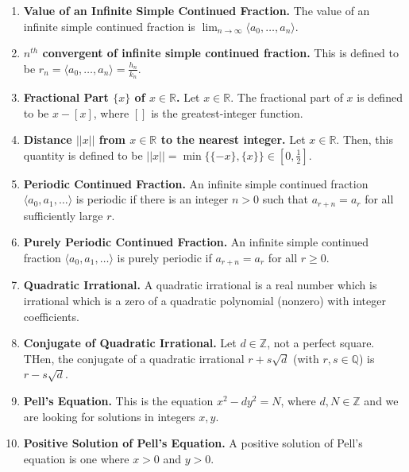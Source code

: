 \documentclass[12pt]{article}
\theoremstyle{definition}
\theoremstyle{named}
\begin{document}
\begin{enumerate}
    \item \textbf{Value of an Infinite Simple Continued Fraction. } The value of an infinite simple continued fraction is $\lim_{n \to \infty} \langle a_0,\dots,a_n \rangle$. 
    \item \textbf{$n^{th}$ convergent of infinite simple continued fraction. } This is defined to be $r_n = \langle a_0,\dots,a_n \rangle = \frac{h_n}{k_n}$. 
    \item \textbf{Fractional Part $\{x\}$ of $x \in \mathbb{R}$. } Let $x \in \mathbb{R}$. The fractional part of $x$ is defined to be $x - [x]$, where $[]$ is the greatest-integer function. 
    \item \textbf{Distance $||x||$ from $x \in \mathbb{R}$ to the nearest integer. } Let $x \in \mathbb{R}$. Then, this quantity is defined to be $||x|| = \min \{\{-x\}, \{x\}\} \in [0,\frac{1}{2}]$. 
    \item \textbf{Periodic Continued Fraction. } An infinite simple continued fraction $\langle a_0,a_1,\dots \rangle$ is periodic if there is an integer $n>0$ such that $a_{r+n} = a_r$ for all sufficiently large $r$. 
    \item \textbf{Purely Periodic Continued Fraction. } An infinite simple continued fraction $\langle a_0,a_1,\dots \rangle$ is purely periodic if $a_{r+n} = a_r$ for all $r \geq 0$. 
    \item \textbf{Quadratic Irrational. } A quadratic irrational is a real number which is irrational which is a zero of a quadratic polynomial (nonzero) with integer coefficients. 
    \item \textbf{Conjugate of Quadratic Irrational. } Let $d \in \mathbb{Z}$, not a perfect square. THen, the conjugate of a quadratic irrational $r + s\sqrt{d}$ (with $r,s \in \mathbb{Q}$) is $r - s\sqrt{d}$. 
    \item \textbf{Pell's Equation. } This is the equation $x^2 - dy^2 = N$, where $d,N \in \mathbb{Z}$ and we are looking for solutions in integers $x,y$. 
    \item \textbf{Positive Solution of Pell's Equation. } A positive solution of Pell's equation is one where $x>0$ and $y>0$. 
\end{enumerate}
\end{document}
